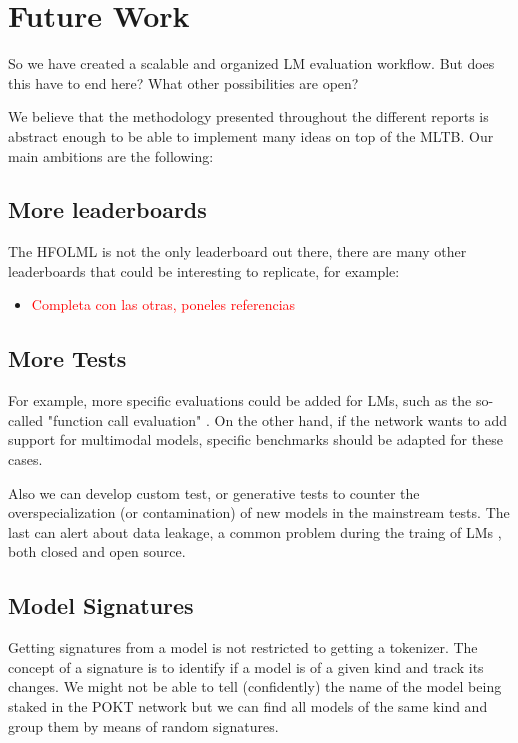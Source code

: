 \section{Future Work}\label{sec:z}

So we have created a scalable and organized \gls{LM} evaluation workflow. But does this have to end here? What other possibilities are open?

We believe that the methodology presented throughout the different reports is abstract enough to be able to implement many ideas on top of the \gls{MLTB}. Our main ambitions are the following:

\subsection*{More leaderboards}

The \gls{HFOLML} is not the only leaderboard out there, there are many other leaderboards that could be interesting to replicate, for example:
\begin{itemize}
    \item \textcolor{red}{Completa con las otras, poneles referencias}
\end{itemize}

\subsection*{More Tests}

For example, more specific evaluations could be added for \glspl{LM}, such as the so-called "function call evaluation" \cite{patil_gorilla_2023}. 
On the other hand, if the network wants to add support for multimodal models, specific benchmarks \cite{yue_mmmu_2024} should be adapted for these cases. 

Also we can develop custom test, or generative tests to counter the overspecialization (or contamination) of new models in the mainstream tests. 
The last can alert about data leakage, a common problem during the traing of \glspl{LM} \cite{zhang_careful_2024, golchin_data_2024, xu_benchmarking_2024, balloccu_leak_2024}, both closed and open source. 

\subsection*{Model Signatures}

Getting signatures from a model is not restricted to getting a tokenizer. The concept of a signature is to identify if a model is of a given kind and track its changes. We might not be able to tell (confidently) the name of the model being staked in the POKT network but we can find all models of the same kind and group them by means of random signatures.

